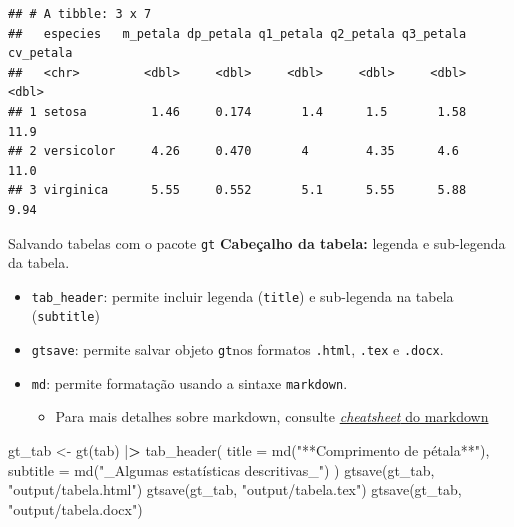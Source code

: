 \documentclass[
  10pt,
  ignorenonframetext,
]{beamer}
\newenvironment{Shaded}{}{}
\newcommand{\DataTypeTok}[1]{#1}
\newcommand{\ErrorTok}[1]{\textcolor[rgb]{1.00,0.00,0.00}{\textbf{#1}}}
\newcommand{\KeywordTok}[1]{\textcolor[rgb]{0.00,0.00,1.00}{#1}}
\newcommand{\NormalTok}[1]{#1}
\newcommand{\OperatorTok}[1]{#1}
\newcommand{\StringTok}[1]{\textcolor[rgb]{0.00,0.50,0.50}{#1}}
\providecommand{\tightlist}{%
  \setlength{\itemsep}{0pt}\setlength{\parskip}{0pt}}
\begin{document}
\begin{frame}[fragile]
\scriptsize

\begin{verbatim}
## # A tibble: 3 x 7
##   especies   m_petala dp_petala q1_petala q2_petala q3_petala cv_petala
##   <chr>         <dbl>     <dbl>     <dbl>     <dbl>     <dbl>     <dbl>
## 1 setosa         1.46     0.174       1.4      1.5       1.58     11.9 
## 2 versicolor     4.26     0.470       4        4.35      4.6      11.0 
## 3 virginica      5.55     0.552       5.1      5.55      5.88      9.94
\end{verbatim}

\normalsize
\end{frame}

\begin{frame}[fragile]{Salvando tabelas com o pacote \texttt{gt}}
\protect\hypertarget{salvando-tabelas-com-o-pacote-gt-2}{}
\textbf{Cabeçalho da tabela:} legenda e sub-legenda da tabela.

\begin{itemize}
\tightlist
\item
  \texttt{tab\_header}: permite incluir legenda (\texttt{title}) e
  sub-legenda na tabela (\texttt{subtitle})
\item
  \texttt{gtsave}: permite salvar objeto \texttt{gt}nos formatos
  \texttt{.html}, \texttt{.tex} e \texttt{.docx}.
\item
  \texttt{md}: permite formatação usando a sintaxe \texttt{markdown}.

  \begin{itemize}
  \tightlist
  \item
    Para mais detalhes sobre markdown, consulte
    \href{https://www.markdownguide.org/cheat-sheet}{\emph{cheatsheet}
    do markdown}
  \end{itemize}
\end{itemize}

\begin{Shaded}
\begin{Highlighting}[]
\NormalTok{gt\_tab \textless{}{-}}\StringTok{ }\KeywordTok{gt}\NormalTok{(tab) }\OperatorTok{|}\ErrorTok{\textgreater{}}
\StringTok{  }\KeywordTok{tab\_header}\NormalTok{(}
    \DataTypeTok{title =} \KeywordTok{md}\NormalTok{(}\StringTok{"**Comprimento de pétala**"}\NormalTok{),}
    \DataTypeTok{subtitle =} \KeywordTok{md}\NormalTok{(}\StringTok{"\_Algumas estatísticas descritivas\_"}\NormalTok{)}
\NormalTok{  )}
\KeywordTok{gtsave}\NormalTok{(gt\_tab, }\StringTok{"output/tabela.html"}\NormalTok{)}
\KeywordTok{gtsave}\NormalTok{(gt\_tab, }\StringTok{"output/tabela.tex"}\NormalTok{)}
\KeywordTok{gtsave}\NormalTok{(gt\_tab, }\StringTok{"output/tabela.docx"}\NormalTok{)}
\end{Highlighting}
\end{Shaded}
\end{frame}
\end{document}
